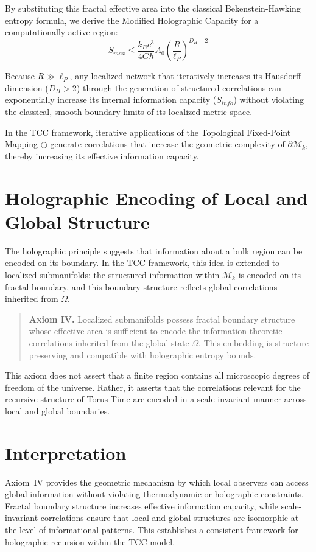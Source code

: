 \documentclass[12pt,openany]{book}
\theoremstyle{plain}
\theoremstyle{definition}
\theoremstyle{remark}
\begin{document}
By substituting this fractal effective area into the classical Bekenstein-Hawking entropy formula, we derive the Modified Holographic Capacity for a computationally active region:
\begin{equation}
S_{max} \le \frac{k_B c^3}{4G\hbar} A_0 \left( \frac{R}{\ell_P} \right)^{D_H - 2}
\end{equation}

Because $R \gg \ell_P$, any localized network that iteratively increases its Hausdorff dimension ($D_H > 2$) through the generation of structured correlations can exponentially increase its internal information capacity ($S_{info}$) without violating the classical, smooth boundary limits of its localized metric space.

In the TCC framework, iterative applications of the Topological Fixed-Point
Mapping $\bigcirc$ generate correlations that increase the geometric complexity
of $\partial \mathcal{M}_{k}$, thereby increasing its effective information
capacity.

\section{Holographic Encoding of Local and Global Structure}
The holographic principle suggests that information about a bulk region can be
encoded on its boundary. In the TCC framework, this idea is extended to
localized submanifolds: the structured information within $\mathcal{M}_{k}$ is
encoded on its fractal boundary, and this boundary structure reflects global
correlations inherited from $\Omega$.

\begin{quote}
\textbf{Axiom IV.}  
Localized submanifolds possess fractal boundary structure whose effective area
is sufficient to encode the information-theoretic correlations inherited from
the global state $\Omega$. This embedding is structure-preserving and
compatible with holographic entropy bounds.
\end{quote}

This axiom does not assert that a finite region contains all microscopic
degrees of freedom of the universe. Rather, it asserts that the correlations
relevant for the recursive structure of Torus-Time are encoded in a
scale-invariant manner across local and global boundaries.

\section{Interpretation}
Axiom~IV provides the geometric mechanism by which local observers can access
global information without violating thermodynamic or holographic constraints.
Fractal boundary structure increases effective information capacity, while
scale-invariant correlations ensure that local and global structures are
isomorphic at the level of informational patterns. This establishes a
consistent framework for holographic recursion within the TCC model.
\end{document}
